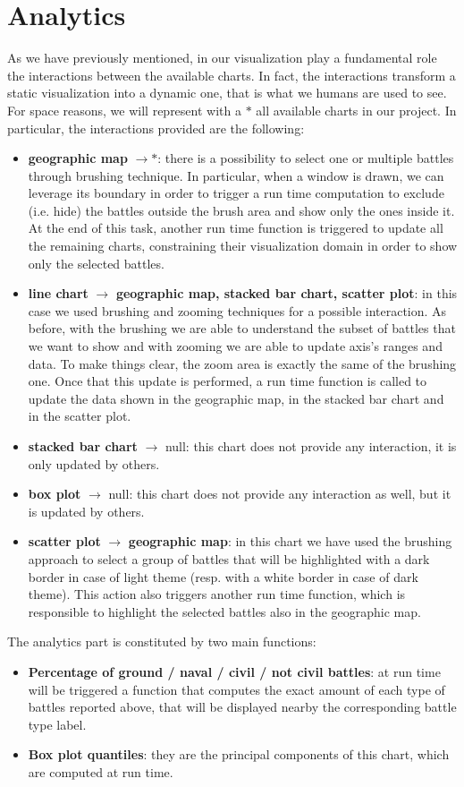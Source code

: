 \section{Analytics}
As we have previously mentioned, in our visualization play a fundamental role the interactions between the available charts.
In fact, the interactions transform a static visualization into a dynamic one, that is what we humans are used to see.
For space reasons, we will represent with a $*$ all available charts in our project.
In particular, the interactions provided are the following:
\begin{itemize}
    \item \textbf{geographic map} $\rightarrow *$: there is a possibility to select one or multiple battles through brushing technique. In particular, when a window is drawn, we can leverage its boundary in order to trigger a run time computation to exclude (i.e. hide) the battles outside the brush area and show only the ones inside it. At the end of this task, another run time function is triggered to update all the remaining charts, constraining their visualization domain in order to show only the selected battles.
    \item \textbf{line chart} $\rightarrow$ \textbf{geographic map, stacked bar chart, scatter plot}: in this case we used brushing and zooming techniques for a possible interaction. As before, with the brushing we are able to understand the subset of battles that we want to show and with zooming we are able to update axis's ranges and data. To make things clear, the zoom area is exactly the same of the brushing one. Once that this update is performed, a run time function is called to update the data shown in the geographic map, in the stacked bar chart and in the scatter plot.
    \item \textbf{stacked bar chart} $\rightarrow$ null: this chart does not provide any interaction, it is only updated by others.
    \item \textbf{box plot} $\rightarrow$ null: this chart does not provide any interaction as well, but it is updated by others.
    \item \textbf{scatter plot} $\rightarrow$ \textbf{geographic map}: in this chart we have used the brushing approach to select a group of battles that will be highlighted with a dark border in case of light theme (resp. with a white border in case of dark theme). This action also triggers another run time function, which is responsible to highlight the selected battles also in the geographic map.
\end{itemize}

The analytics part is constituted by two main functions:
\begin{itemize}
\item \textbf{Percentage of ground / naval / civil / not civil battles}: at run time will be triggered a function that computes the exact amount of each type of battles reported above, that will be displayed nearby the corresponding battle type label.
\item \textbf{Box plot quantiles}: they are the principal components of this chart, which are computed at run time.
\end{itemize}
